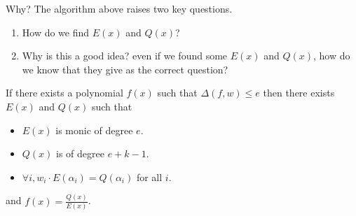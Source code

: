 \begin{bclogo}[logo=\bcquestion]{Why?}
    The algorithm above raises two key questions.
    \begin{enumerate}
        \item How do we find $E(x)$ and $Q(x)$?
        \item Why is this a good idea? even if we found some $E(x)$ and $Q(x)$, 
        how do we know that they give as the correct question?
    \end{enumerate}    
\end{bclogo}


\begin{theorem}
 If there exists a polynomial $f(x)$ such that $\Delta(f,w)\le e$
 then there exists $E(x)$ and $Q(x)$ such that 

 \begin{itemize}
    \item $E(x)$ is monic of degree $e$.
    \item $Q(x)$ is of degree $e+k-1$.
    \item $\forall i, w_i\cdot E(\alpha_i)=Q(\alpha_i)$ for all $i$.
 \end{itemize}\label{theorem:berlekamp-welch:demands}

 and $f(x)=\frac{Q(x)}{E(x)}$.
\end{theorem}

